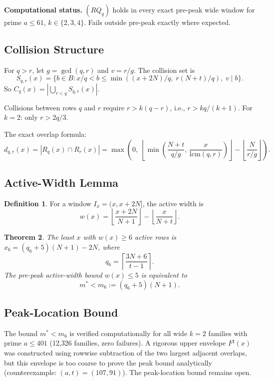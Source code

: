 \documentclass[11pt,a4paper]{article}
\newtheorem{theorem}{Theorem}[section]
\theoremstyle{definition}
\newtheorem{definition}[theorem]{Definition}
\newcommand{\floor}[1]{\left\lfloor #1 \right\rfloor}
\newcommand{\ceil}[1]{\left\lceil #1 \right\rceil}
\begin{document}
\textbf{Computational status.} $(RQ_q)$ holds in every exact pre-peak 
wide window for prime $a \leq 61$, $k \in \{2,3,4\}$. Fails outside 
pre-peak exactly where expected.

\subsection{Collision Structure}

For $q > r$, let $g = \gcd(q,r)$ and $v = r/g$. The collision set is
\[
S_{q,r}(x) = \{b \in B : x/q < b \leq \min((x+2N)/q,\; r(N+t)/q),\; v \mid b\}.
\]
So $C_q(x) = |\bigcup_{r<q} S_{q,r}(x)|$.

Collisions between rows $q$ and $r$ require $r > k(q-r)$, i.e., 
$r > kq/(k+1)$. For $k=2$: only $r > 2q/3$.

The exact overlap formula:
\[
d_{q,r}(x) = |R_q(x) \cap R_r(x)| 
= \max\!\left(0,\; \floor{\min\!\left(\frac{N+t}{q/g},\, \frac{x}{\text{lcm}(q,r)}\right)} - \floor{\frac{N}{r/g}}\right).
\]

\subsection{Active-Width Lemma}

\begin{definition}
For a window $I_x = (x, x+2N]$, the active width is
\[
w(x) = \floor{\frac{x+2N}{N+1}} - \floor{\frac{x}{N+t}} .
\]
\end{definition}

\begin{theorem}\label{thm:active-width}
The least $x$ with $w(x) \geq 6$ active rows is 
$x_6 = (q_6+5)(N+1) - 2N$, where
\[
q_6 = \ceil{\frac{3N+6}{t-1}}.
\]
The pre-peak active-width bound $w(x) \leq 5$ is equivalent to
\[
m^* < m_6 := (q_6+5)(N+1).
\]
\end{theorem}

\subsection{Peak-Location Bound}

The bound $m^* < m_6$ is verified computationally for all wide $k=2$ 
families with prime $a \leq 401$ (12{,}326 families, zero failures). 
A rigorous upper envelope $F^{\sharp}(x)$ was constructed using rowwise 
subtraction of the two largest adjacent overlaps, but this envelope is 
too coarse to prove the peak bound analytically (counterexample: 
$(a,t) = (107,91)$). The peak-location bound remains open.
\end{document}
